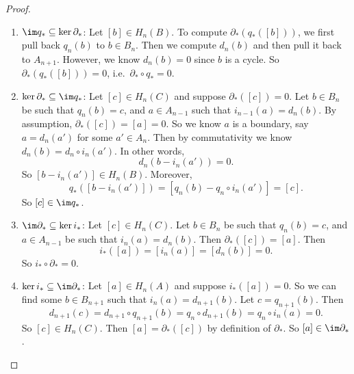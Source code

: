 \documentclass[a4paper]{article}
\theoremstyle{definition}
\begin{document}
\begin{proof}
\begin{enumerate}
\begin{enumerate}
          \[
            q_n (b - d_{n + 1}(b')) = 0.
          \]
          By exactness of the sequence, we know there is some $a \in A_n$ such that
          \[
            i_n(a) = b - d_{n + 1}(b').
          \]
          Moreover,
          \[
            i_{n - 1} \circ d_n(a) = d_n \circ i_n (a) = d_n(b - d_{n + 1}(b')) = 0,
          \]
          using the fact that $b$ is a cycle. Since $i_{n - 1}$ is injective, it follows that $d_n(a) = 0$. So $[a] \in H_n(A)$. Then
          \[
            i_*([a]) = [b] - [d_{n + 1}(b')] = [b].
          \]
          So $[b] \in \im i_*$.
        \item $\im q_* \subseteq \ker \partial_*$: Let $[b] \in H_n(B)$. To compute $\partial_*(q_*([b]))$, we first pull back $q_n(b)$ to $b \in B_n$. Then we compute $d_n(b)$ and then pull it back to $A_{n + 1}$. However, we know $d_n(b) = 0$ since $b$ is a cycle. So $\partial_*(q_*([b])) = 0$, i.e.\ $\partial_* \circ q_* = 0$.
        \item $\ker \partial_* \subseteq \im q_*$: Let $[c] \in H_n(C)$ and suppose $\partial_*([c]) = 0$. Let $b \in B_n$ be such that $q_n(b) = c$, and $a \in A_{n - 1}$ such that $i_{n - 1}(a) = d_n(b)$. By assumption, $\partial_*([c]) = [a] = 0$. So we know $a$ is a boundary, say $a = d_n (a')$ for some $a' \in A_n$. Then by commutativity we know $d_n(b) = d_n \circ i_n (a')$. In other words,
          \[
            d_n(b - i_n(a')) = 0.
          \]
          So $[b - i_n(a')] \in H_n(B)$. Moreover,
          \[
            q_*([b - i_n(a')]) = [q_n(b) - q_n \circ i_n(a')] = [c].
          \]
          So $[c] \in \im q_*$.
        \item $\im \partial_* \subseteq \ker i_*$: Let $[c] \in H_n(C)$. Let $b \in B_n$ be such that $q_n(b) = c$, and $a \in A_{n - 1}$ be such that $i_n(a) = d_n(b)$. Then $\partial_*([c]) = [a]$. Then
          \[
            i_*([a]) = [i_n(a)] = [d_n(b)] = 0.
          \]
          So $i_* \circ \partial_* = 0$.
        \item $\ker i_* \subseteq \im \partial_*$: Let $[a] \in H_n(A)$ and suppose $i_*([a]) = 0$. So we can find some $b \in B_{n + 1}$ such that $i_n(a) = d_{n + 1}(b)$. Let $c = q_{n + 1}(b)$. Then
          \[
            d_{n + 1}(c) = d_{n + 1}\circ q_{n + 1} (b) = q_n \circ d_{n + 1}(b) = q_n \circ i_n (a) = 0.
          \]
          So $[c] \in H_n(C)$. Then $[a] = \partial_*([c])$ by definition of $\partial_*$. So $[a] \in \im \partial_*$.\qedhere
      \end{enumerate}%
  \end{enumerate}
\end{proof}
\end{document}
